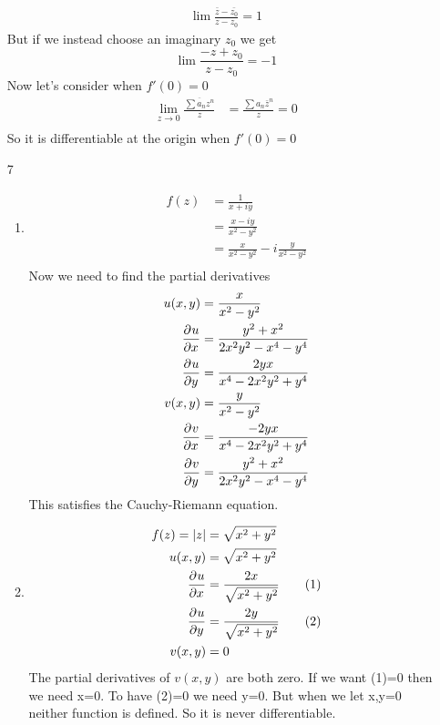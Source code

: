 \documentclass{article}
\begin{document}
\begin{enumerate}
      \begin{align*}
        \lim\frac{\bar{z}-\bar{z_0}}{z-z_0}=1
      \end{align*}
      But if we instead choose an imaginary $z_0$ we get
      \[\lim\frac{-z+z_0}{z-z_0}=-1\]
      Now let's consider when $f'(0)=0$
      \begin{align*}
        \lim_{z\to0}\frac{\overline{\sum a_nz^n}}{z}&=\frac{\sum a_n\bar{z}^n}{z}=0\\
      \end{align*}
      So it is differentiable at the origin when $f'(0)=0$
    \item[7]
      \begin{enumerate}
        \item
          \begin{align*}
            f(z)&=\frac{1}{x+iy}\\
            &=\frac{x-iy}{x^2-y^2}\\
            &=\frac{x}{x^2-y^2}-i\frac{y}{x^2-y^2}\\
          \end{align*}
          Now we need to find the partial derivatives
          \begin{align*}
            u(x,y)&=\frac{x}{x^2-y^2}\\
            \frac{\partial^{}u}{\partial x^{}}&=\frac{y^2+x^2}{2x^2y^2-x^4-y^4}\\
            \frac{\partial^{}u}{\partial y^{}}&=\frac{2yx}{x^4-2x^2y^2+y^4}\\
            v(x,y)&=\frac{y}{x^2-y^2}\\
            \frac{\partial^{}v}{\partial x^{}}&=\frac{-2yx}{x^4-2x^2y^2+y^4}\\
            \frac{\partial^{}v}{\partial y^{}}&=\frac{y^2+x^2}{2x^2y^2-x^4-y^4}\\
          \end{align*}
          This satisfies the Cauchy-Riemann equation.
        \item
          \begin{align*}
            f(z)=|z|&=\sqrt{x^2+y^2}\\
            u(x,y)&=\sqrt{x^2+y^2}\\
            \frac{\partial^{}u}{\partial x^{}}&=\frac{2x}{\sqrt{x^2+y^2}}\tag{1}\\
            \frac{\partial^{}u}{\partial y^{}}&=\frac{2y}{\sqrt{x^2+y^2}}\tag{2}\\
            v(x,y)&=0
          \end{align*}
          The partial derivatives of $v(x,y)$ are both zero. If we want (1)=0 then we need x=0. To have (2)=0 we need y=0. But when we let x,y=0 neither function is defined. So it is never differentiable.

\end{enumerate}
\end{enumerate}
\end{document}

